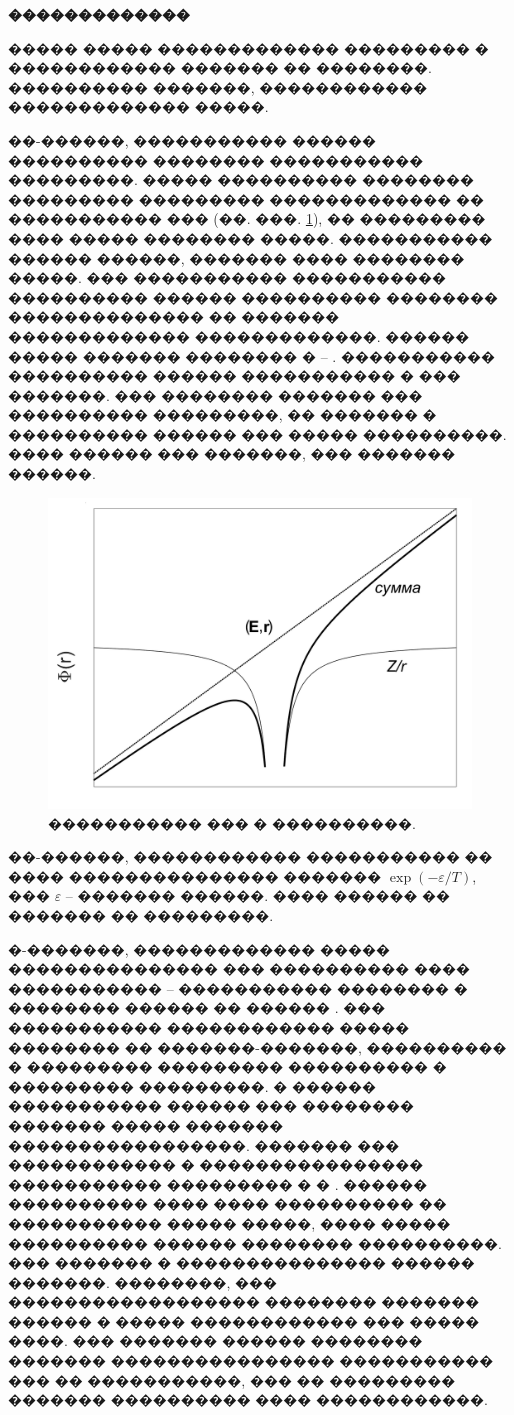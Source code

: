 \documentclass[12pt,titlepage]{article}
\begin{document}
\bigskip

\textbf{�������������}

����� ����� ������������� ��������� � ������������ ������� �� ��������. ���������� �������, ������������ ������������� �����.

��-������, ����������� ������ ���������� �������� ����������� ���������. ����� ���������� �������� ��������� ��������� ������������� �� ����������� ��� (��. ���. \ref{figCoulombWell}), �� ��������� ���� ����� �������� �����. ����������� ������ ������, ������� ���� �������� �����. ��� ����������� ����������� ���������� ������ ���������� �������� �������������� �� ������� ������������� �������������. ������ ����� ������� �������� � \cite{Kalitkin2006} -- \cite{Kalitkin2011}. ����������� ���������� ������ ����������� � ��� �������. ��� �������� ������� ��� ���������� ���������, �� ������� � ���������� ������ ��� ����� ����������. ���� ������ ��� �������, ��� ������� ������.

\begin{figure}[h!]
\centerline{
\includegraphics[width=0.7\linewidth]{potential.png}
}
\caption{����������� ��� � ����������.} \label{figCoulombWell}
\end{figure}

��-������, ������������ ����������� �� ���� ��������������� ������� $\exp(-\varepsilon/T)$, ��� $\varepsilon$ -- ������� ������. ���� ������ �� ������� �� ���������.

�-�������, ������������� ����� ��������������� ��� ���������� ���� ����������� -- ����������� �������� � �������� ������ �� ������ \cite{Landau}. ��� ����������� ������������ ����� �������� �� �������-�������, ���������� � ��������� ��������� ���������� � ��������� ���������. � ������ ����������� ������ ��� �������� ������� ����� ������� �����������������. ������� ��� ������������ � ���������������� ����������� ��������� � \cite{Nikiforov} � \cite{Lisitsa}. ������ ���������� ���� ���� ���������� �� ����������� ����� �����, ���� ����� ���������� ������ �������� ����������. ��� ������� � ��������������� ������ �������. ��������, ��� ������������������ �������� ������� ������ � ����� ������������ ��� ����� ����. ��� ������� ������ �������� ������� ���������������� ����������� ��� �� �����������, ��� �� ��������� ������� ���������� ���� ������������.
\end{document}
